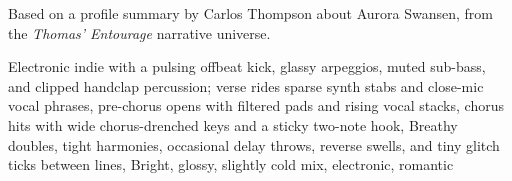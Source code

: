 
\begin{notes}
Based on a profile summary by Carlos Thompson about Aurora Swansen, from the \emph{Thomas’ Entourage} narrative universe.
\end{notes}
\begin{style}
Electronic indie with a pulsing offbeat kick, glassy arpeggios, muted sub-bass, and clipped handclap percussion; verse rides sparse synth stabs and close-mic vocal phrases, pre-chorus opens with filtered pads and rising vocal stacks, chorus hits with wide chorus-drenched keys and a sticky two-note hook, Breathy doubles, tight harmonies, occasional delay throws, reverse swells, and tiny glitch ticks between lines, Bright, glossy, slightly cold mix, electronic, romantic
\end{style}
